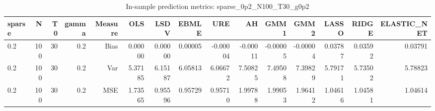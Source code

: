 \begin{table}[!htbp]\centering
\caption{In-sample prediction metrics: sparse_0p2_N100_T30_g0p2}
\label{tab:table2_sparse_0p2_N100_T30_g0p2}
\begin{tabular}{lrrrrrrrrrrrrrr}
\hline
sparse & N & T0 & gamma & Measure & OLS & LSDV & EBMLE & URE & AH & GMM1 & GMM2 & LASSO & RIDGE & ELASTIC_NET \\
\hline
0.2 & 100 & 30 & 0.2 & Bias & 0.00000 & 0.00000 & 0.00005 & -0.00004 & -0.00011 & -0.00005 & -0.00004 & 0.03787 & 0.03592 & 0.03791 \\
0.2 & 100 & 30 & 0.2 & Var & 5.37185 & 6.15187 & 6.05813 & 6.06672 & 7.50825 & 7.49508 & 7.39829 & 5.79171 & 5.73502 & 5.78823 \\
0.2 & 100 & 30 & 0.2 & MSE & 1.73565 & 0.95596 & 0.95729 & 0.95710 & 1.99788 & 1.99053 & 1.96412 & 1.04616 & 1.04581 & 1.04614 \\
\hline
\end{tabular}
\end{table}

